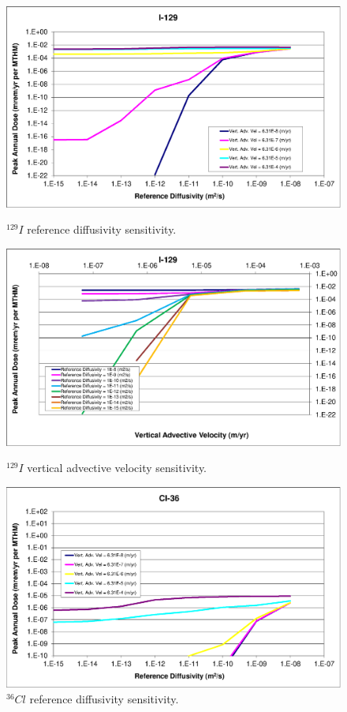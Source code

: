 \begin{figure}[htp!]
\begin{minipage}[b]{0.45\linewidth}
\centering
\includegraphics[width=\linewidth]{./chapters/nuclide_sensitivity/clay/AdvVelAndDiffCoeffEBSFail/I-129.eps}
\caption{$^{129}I$ reference diffusivity sensitivity.}
\label{fig:VAdvVelI129}

\includegraphics[width=\linewidth]{./chapters/nuclide_sensitivity/clay/AdvVelAndDiffCoeffEBSFail/I-129-VAdvVel.eps}
\caption{$^{129}I$ vertical advective velocity sensitivity.}
\label{fig:VAdvVelI129VAdvVel}

\end{minipage}
\hspace{0.05\linewidth}
\begin{minipage}[b]{0.45\linewidth}

\includegraphics[width=\textwidth]{./chapters/nuclide_sensitivity/clay/AdvVelAndDiffCoeffEBSFail/Cl-36.eps}
\caption{$^{36}Cl$ reference diffusivity sensitivity.}
\label{fig:VAdvVelCl36}


\end{minipage}
\end{figure}
